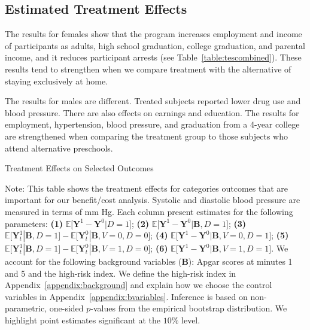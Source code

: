 \subsection{Estimated Treatment Effects}

The results for females show that the program increases employment and income of participants as adults, high school graduation, college graduation, and parental income, and it reduces participant arrests (see Table~\ref{table:tescombined}). These results tend to strengthen when we compare treatment with the alternative of staying exclusively at home.

The results for males are different. Treated subjects reported lower drug use and blood pressure. There are also effects on earnings and education. The results for employment, hypertension, blood pressure, and graduation from a 4-year college are strengthened when comparing the treatment group to those subjects who attend alternative preschools.

\begin{table}[!htbp]
\centering
\begin{threeparttable}
\caption{Treatment Effects on Selected Outcomes}\label{table:tescombined}
\begin{scriptsize}

\end{scriptsize}
\begin{tablenotes}
\tiny
Note: This table shows the treatment effects for categories outcomes that are important for our benefit/cost analysis. Systolic and diastolic blood pressure are measured in terms of mm Hg. Each column present estimates for the following parameters: \textbf{(1)} $\mathbb{E} \big[ \bm{Y}^1 - \bm{Y}^0 | D = 1]$; {\textbf{(2)} $\mathbb{E} \big[ \bm{Y}^1 - \bm{Y}^0 | \bm{B}, D=1 \big]$}; {\textbf{(3)} $\mathbb{E} \big[ \bm{Y}^1_t | \bm{B}, D=1 \big] - \mathbb{E} \big[ \bm{Y}^0_t | \bm{B}, V=0, D=0 \big]$}; {\textbf{(4)} $\mathbb{E} \big[ \bm{Y}^1 - \bm{Y}^0 | \bm{B}, V=0, D = 1 \big] $}; {\textbf{(5)} $\mathbb{E} \big[ \bm{Y}^1_t | \bm{B}, D=1 \big] - \mathbb{E} \big[ \bm{Y}^0_t | \bm{B}, V=1, D = 0 \big]$}; {\textbf{(6)} $\mathbb{E} \big[ \bm{Y}^1 - \bm{Y}^0 | \bm{B}, V=1 , D = 1\big]$}. We account for the following background variables ($\bm{B}$): Apgar scores at minutes 1 and 5 and the high-risk index. We define the high-risk index in Appendix~\ref{appendix:background} and explain how we choose the control variables in Appendix~\ref{appendix:bvariables}. Inference is based on non-parametric, one-sided $p$-values from the empirical bootstrap distribution. We highlight point estimates significant at the $10\%$ level.
\end{tablenotes}
\end{threeparttable}
\end{table}
\restoregeometry
\doublespacing

